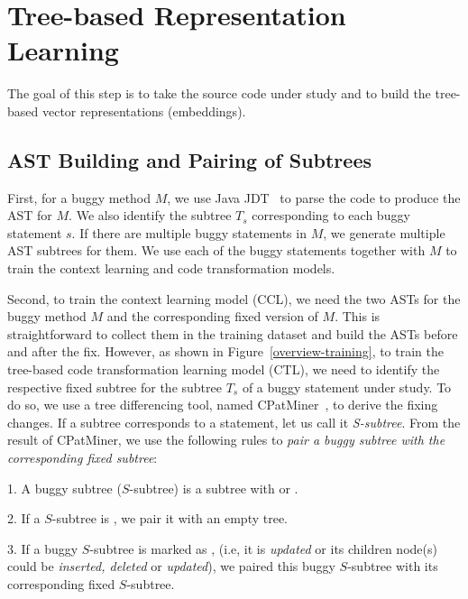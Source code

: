 \section{Tree-based Representation Learning}


The goal of this step is to take the source code under study and to
build the tree-based vector representations (embeddings).

\subsection{AST Building and Pairing of Subtrees}

First, for a buggy method $M$, we use Java JDT~\cite{JDT} to parse the
code to produce the AST for $M$. We also identify the subtree $T_s$
corresponding to each buggy statement $s$. If there are multiple buggy
statements in $M$, we generate multiple AST subtrees for them.  We use
each of the buggy statements together with $M$ to train the context
learning and code transformation models.

Second, to train the context learning model (CCL), we need the
two ASTs for the buggy method $M$ and the corresponding fixed version
of $M$. This is straightforward to collect them in the training
dataset and build the ASTs before and after the fix.  However, as
shown in Figure~\ref{overview-training}, to train the tree-based code
transformation learning model (CTL), we need to identify the
respective fixed subtree for the subtree $T_s$ of a buggy
statement under study. To do so, we use a tree differencing
tool, named CPatMiner~\cite{nguyen2019graph}, to derive the fixing
changes. If a subtree corresponds to a statement, let us call it {\em
  S-subtree}. From the result of CPatMiner, we use the following rules
to {\em pair a buggy subtree with the corresponding fixed subtree}:

1. A buggy subtree ($S$-subtree) is a subtree with
 or .

2. If a $S$-subtree is , we pair it with an empty tree.

3. If a buggy $S$-subtree is marked as , (i.e, it is
{\em updated} or its children node(s) could be {\em inserted, deleted} or {\em
  updated}), we paired this buggy $S$-subtree with its corresponding
fixed $S$-subtree.

